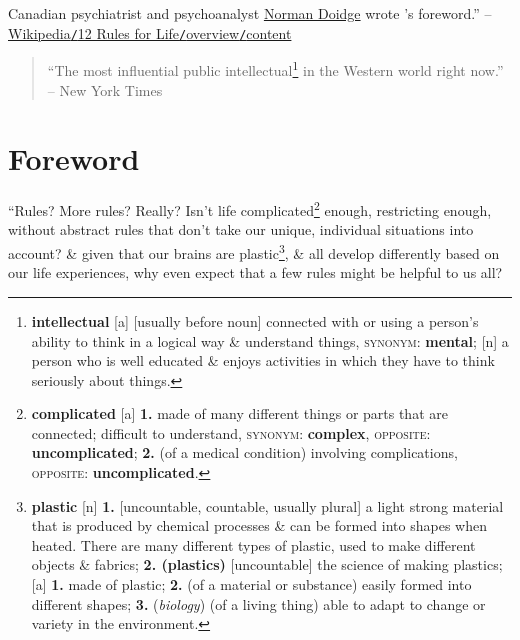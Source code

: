 \documentclass[oneside]{book}
\numberwithin{equation}{section}
\begin{document}
Canadian psychiatrist and psychoanalyst \href{https://en.wikipedia.org/wiki/Norman_Doidge}{Norman Doidge} wrote \cite{Peterson2018}'s foreword.'' -- \href{https://en.wikipedia.org/wiki/12_Rules_for_Life#Content}{Wikipedia\texttt{/}12 Rules for Life\texttt{/}overview\texttt{/}content}

\begin{quotation}
	``The most influential public intellectual\footnote{\textbf{intellectual} [a] [usually before noun] connected with or using a person's ability to think in a logical way \& understand things, \textsc{synonym}: \textbf{mental}; [n] a person who is well educated \& enjoys activities in which they have to think seriously about things.} in the Western world right now.'' -- New York Times
\end{quotation}

\section*{Foreword}
``Rules? More rules? Really? Isn't life complicated\footnote{\textbf{complicated} [a] \textbf{1.} made of many different things or parts that are connected; difficult to understand, \textsc{synonym}: \textbf{complex}, \textsc{opposite}: \textbf{uncomplicated}; \textbf{2.} (of a medical condition) involving complications, \textsc{opposite}: \textbf{uncomplicated}.} enough, restricting enough, without abstract rules that don't take our unique, individual situations into account? \& given that our brains are plastic\footnote{\textbf{plastic} [n] \textbf{1.} [uncountable, countable, usually plural] a light strong material that is produced by chemical processes \& can be formed into shapes when heated. There are many different types of plastic, used to make different objects \& fabrics; \textbf{2. (plastics)} [uncountable] the science of making plastics; [a] \textbf{1.} made of plastic; \textbf{2.} (of a material or substance) easily formed into different shapes; \textbf{3.} (\textit{biology}) (of a living thing) able to adapt to change or variety in the environment.}, \& all develop differently based on our life experiences, why even expect that a few rules might be helpful to us all?
\end{document}
